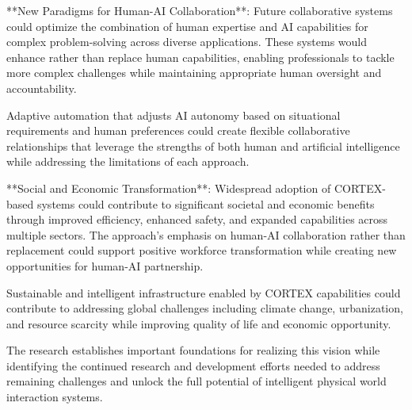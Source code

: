 **New Paradigms for Human-AI Collaboration**:
Future collaborative systems could optimize the combination of human expertise and AI capabilities for complex problem-solving across diverse applications. These systems would enhance rather than replace human capabilities, enabling professionals to tackle more complex challenges while maintaining appropriate human oversight and accountability.

Adaptive automation that adjusts AI autonomy based on situational requirements and human preferences could create flexible collaborative relationships that leverage the strengths of both human and artificial intelligence while addressing the limitations of each approach.

**Social and Economic Transformation**:
Widespread adoption of CORTEX-based systems could contribute to significant societal and economic benefits through improved efficiency, enhanced safety, and expanded capabilities across multiple sectors. The approach's emphasis on human-AI collaboration rather than replacement could support positive workforce transformation while creating new opportunities for human-AI partnership.

Sustainable and intelligent infrastructure enabled by CORTEX capabilities could contribute to addressing global challenges including climate change, urbanization, and resource scarcity while improving quality of life and economic opportunity.

The research establishes important foundations for realizing this vision while identifying the continued research and development efforts needed to address remaining challenges and unlock the full potential of intelligent physical world interaction systems. 